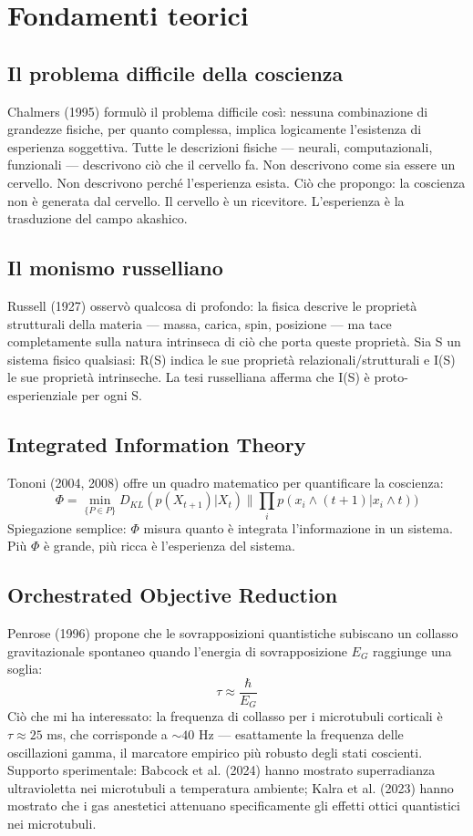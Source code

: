 \section{Fondamenti teorici}
\subsection{Il problema difficile della coscienza}
Chalmers (1995) formulò il problema difficile così: nessuna combinazione di grandezze fisiche, per quanto complessa, implica logicamente l'esistenza di esperienza soggettiva. Tutte le descrizioni fisiche --- neurali, computazionali, funzionali --- descrivono ciò che il cervello fa. Non descrivono come sia essere un cervello. Non descrivono perché l'esperienza esista. Ciò che propongo: la coscienza non è generata dal cervello. Il cervello è un ricevitore. L'esperienza è la trasduzione del campo akashico.

\subsection{Il monismo russelliano}
Russell (1927) osservò qualcosa di profondo: la fisica descrive le proprietà strutturali della materia --- massa, carica, spin, posizione --- ma tace completamente sulla natura intrinseca di ciò che porta queste proprietà. Sia S un sistema fisico qualsiasi: R(S) indica le sue proprietà relazionali/strutturali e I(S) le sue proprietà intrinseche. La tesi russelliana afferma che I(S) è proto-esperienziale per ogni S.

\subsection{Integrated Information Theory}
Tononi (2004, 2008) offre un quadro matematico per quantificare la coscienza:
\begin{equation}
\Phi = \min_{\{P \in P\}} D_{KL}(p(X_{t+1})|X_{t}) \parallel \prod_{i} p(x_{i} \land (t+1)|x_{i} \land t))
\end{equation}
Spiegazione semplice: $\Phi$ misura quanto è integrata l'informazione in un sistema. Più $\Phi$ è grande, più ricca è l'esperienza del sistema.

\subsection{Orchestrated Objective Reduction}
Penrose (1996) propone che le sovrapposizioni quantistiche subiscano un collasso gravitazionale spontaneo quando l'energia di sovrapposizione $E_G$ raggiunge una soglia:
\begin{equation}
\tau \approx \frac{\hbar}{E_G}
\end{equation}
Ciò che mi ha interessato: la frequenza di collasso per i microtubuli corticali è $\tau \approx 25$ ms, che corrisponde a $\sim 40$ Hz --- esattamente la frequenza delle oscillazioni gamma, il marcatore empirico più robusto degli stati coscienti. Supporto sperimentale: Babcock et al. (2024) hanno mostrato superradianza ultravioletta nei microtubuli a temperatura ambiente; Kalra et al. (2023) hanno mostrato che i gas anestetici attenuano specificamente gli effetti ottici quantistici nei microtubuli.

